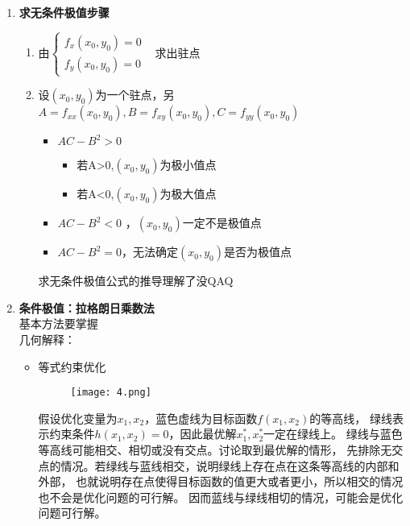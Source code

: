 \documentclass[12pt]{scrartcl}
\begin{document}
{\begin{enumerate}
\begin{enumerate}
        \item \textbf{求无条件极值步骤}
        \begin{enumerate}
            \item 由$\left\{
                \begin{array}{lr}
                f_x(x_0,y_0)=0 &  \\
                f_y(x_0,y_0)=0 &  
                \end{array}
                \right.$求出驻点
            \item 设$(x_0,y_0)$为一个驻点，另$A=f_{xx}(x_0,y_0),B=f_{xy}(x_0,y_0),C=f_{yy}(x_0,y_0)$
            \begin{itemize}
                \item $AC-B^2>0$
                 \begin{itemize}
                     \item 若A>0,$(x_0,y_0)$为极小值点
                     \item 若A<0,$(x_0,y_0)$为极大值点
                 \end{itemize}
                \item $AC-B^2<0$ ，$(x_0,y_0)$一定不是极值点
                \item $AC-B^2=0$，无法确定$(x_0,y_0)$是否为极值点
            \end{itemize}
            求无条件极值公式的推导理解了没QAQ
            \end{enumerate}
        \item \textbf{条件极值：拉格朗日乘数法}\\
        基本方法要掌握\\
        几何解释：
        \begin{itemize}
            \item 等式约束优化
            \begin{figure}[H]
                \centering
                \texttt{[image: 4.png]}
                \end{figure}
            \hspace*{20pt}假设优化变量为$x_1,x_2$，蓝色虚线为目标函数$f(x_1,x_2)$的等高线，
            绿线表示约束条件$h(x_1,x_2)=0$，因此最优解$x_1^*,x_2^*$一定在绿线上。
            绿线与蓝色等高线可能相交、相切或没有交点。讨论取到最优解的情形，
            先排除无交点的情况。若绿线与蓝线相交，说明绿线上存在点在这条等高线的内部和外部，
            也就说明存在点使得目标函数的值更大或者更小，所以相交的情况也不会是优化问题的可行解。
            因而蓝线与绿线相切的情况，可能会是优化问题可行解。

\end{itemize}
\end{enumerate}
\end{enumerate}}
\end{document}
